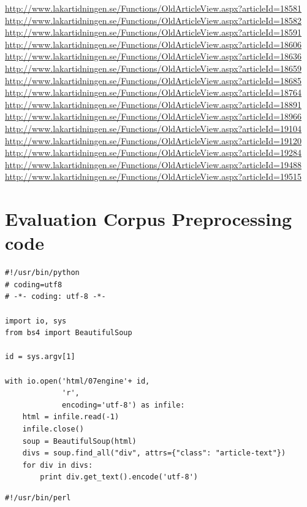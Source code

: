 \documentclass[a4paper]{report}
\begin{document}
\begin{appendices}
\begin{footnotesize}
\url{http://www.lakartidningen.se/Functions/OldArticleView.aspx?articleId=18581}
\url{http://www.lakartidningen.se/Functions/OldArticleView.aspx?articleId=18582}
\url{http://www.lakartidningen.se/Functions/OldArticleView.aspx?articleId=18591}
\url{http://www.lakartidningen.se/Functions/OldArticleView.aspx?articleId=18606}
\url{http://www.lakartidningen.se/Functions/OldArticleView.aspx?articleId=18636}
\url{http://www.lakartidningen.se/Functions/OldArticleView.aspx?articleId=18659}
\url{http://www.lakartidningen.se/Functions/OldArticleView.aspx?articleId=18685}
\url{http://www.lakartidningen.se/Functions/OldArticleView.aspx?articleId=18764}
\url{http://www.lakartidningen.se/Functions/OldArticleView.aspx?articleId=18891}
\url{http://www.lakartidningen.se/Functions/OldArticleView.aspx?articleId=18966}
\url{http://www.lakartidningen.se/Functions/OldArticleView.aspx?articleId=19104}
\url{http://www.lakartidningen.se/Functions/OldArticleView.aspx?articleId=19120}
\url{http://www.lakartidningen.se/Functions/OldArticleView.aspx?articleId=19284}
\url{http://www.lakartidningen.se/Functions/OldArticleView.aspx?articleId=19488}
\url{http://www.lakartidningen.se/Functions/OldArticleView.aspx?articleId=19515}
\end{footnotesize}

\chapter{Evaluation Corpus Preprocessing code}

\begin{Code}
\begin{lstlisting}[frame=single]
#!/usr/bin/python
# coding=utf8
# -*- coding: utf-8 -*-

import io, sys
from bs4 import BeautifulSoup

id = sys.argv[1]

with io.open('html/07engine'+ id,
             'r',
             encoding='utf-8') as infile:
    html = infile.read(-1)
    infile.close()
    soup = BeautifulSoup(html)
    divs = soup.find_all("div", attrs={"class": "article-text"})
    for div in divs:
        print div.get_text().encode('utf-8')

\end{lstlisting}
\end{Code}

\begin{Code}
\begin{lstlisting}[frame=single]
#!/usr/bin/perl


\end{lstlisting}
\end{Code}
\end{appendices}
\end{document}
